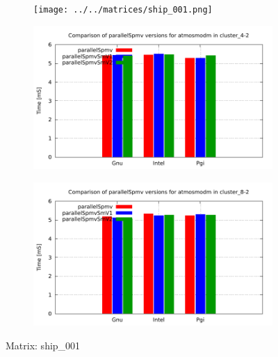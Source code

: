 \begin{figure} [ht!]
    \centering
    \captionsetup{justification=centering, singlelinecheck=false}
    \begin{subfigure}{.25\textwidth}
      \centering
      \hspace*{-1.5cm} 
      \texttt{[image: ../../matrices/ship\_001.png]}
      \label{fig:ship_001_matrix}
    \end{subfigure}%
    \begin{subfigure}{.37\textwidth}
      \centering
      \hspace*{-1.0cm} 
      \includegraphics[page=6, width=0.95\linewidth]{../plots/myCluster_4-2.pdf}
      \label{fig:ship_001_performance}
    \end{subfigure}
    \begin{subfigure}{.37\textwidth}
      \centering
      \hspace*{-1.0cm} 
      \includegraphics[page=6, width=0.95\linewidth]{../plots/myCluster_8-2.pdf}
      \label{fig:ship_001_performance}
    \end{subfigure}
\caption{Matrix: ship\_001}
\label{fig:ship_001}
\end{figure}

